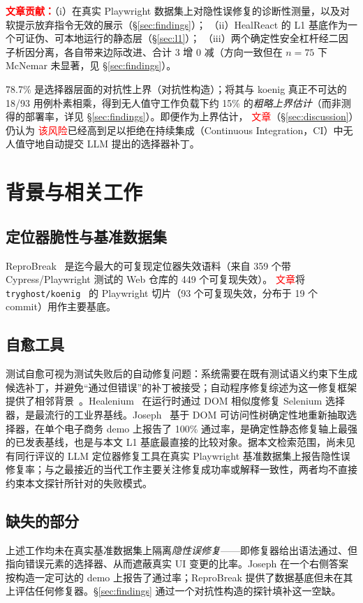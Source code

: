 \documentclass[UTF8, a4paper, 10.5pt, twocolumn, fontset=none]{ctexart}
\providecommand{\DIFaddbegin}{} %
\providecommand{\DIFaddend}{} %
\providecommand{\DIFaddtex}[1]{\textcolor{red}{#1}} %
\providecommand{\DIFadd}[1]{\texorpdfstring{\DIFaddtex{#1}}{#1}} %
\providecommand{\DIFaddincludegraphics}[2][]{{\color{blue}\fbox{\DIFOincludegraphics[#1]{#2}}}} %
\DeclareRobustCommand{\DIFaddbegin}{\DIFOaddbegin \let\includegraphics\DIFaddincludegraphics} %
\DeclareRobustCommand{\DIFaddend}{\DIFOaddend \let\includegraphics\DIFOincludegraphics} %
\begin{document}
 \DIFaddbegin \noindent\DIFadd{\textbf{文章贡献：}}\DIFaddend （i）在真实 Playwright 数据集上对隐性误修复的诊断性测量，以及对软提示放弃指令无效的展示（\S\ref{sec:findings}）；
（ii）HealReact 的 L1 基底作为一个可证伪、可本地运行的静态层（\S\ref{sec:l1}）；
（iii）两个确定性安全杠杆经二因子析因分离，各自带来边际改进、合计 3 增 0 减（方向一致但在 $n=75$ 下 McNemar 未显著，见 \S\ref{sec:findings}）。

78.7\% 是选择器层面的对抗性上界（对抗性构造）；将其与 koenig 真正不可达的 18/93 用例朴素相乘，得到无人值守工作负载下约 15\% 的\emph{粗略上界估计}（而非测得的部署率，详见 \S\ref{sec:findings}）。即便作为上界估计， \DIFaddbegin \DIFadd{文章}\DIFaddend （\S\ref{sec:discussion}）仍认为 \DIFaddbegin \DIFadd{该风险}\DIFaddend 已经高到足以拒绝在持续集成（Continuous Integration，CI）中无人值守地自动提交 LLM 提出的选择器补丁。

\section{背景与相关工作}
\label{sec:background}

\subsection{定位器脆性与基准数据集}
ReproBreak~\cite{mouraReproBreak2026} 是迄今最大的可复现定位器失效语料（来自 359 个带 Cypress/Playwright 测试的 Web 仓库的 449 个可复现失效）。 \DIFaddbegin \DIFadd{文章}\DIFaddend 将 \texttt{tryghost/koenig}~\cite{koenig} 的 Playwright 切片（93 个可复现失效，分布于 19 个 commit）用作主要基底。

\subsection{自愈工具}
测试自愈可视为测试失败后的自动修复问题：系统需要在既有测试语义约束下生成候选补丁，并避免“通过但错误”的补丁被接受；自动程序修复综述为这一修复框架提供了相邻背景~\cite{li2019programRepair}。Healenium~\cite{healenium} 在运行时通过 DOM 相似度修复 Selenium 选择器，是最流行的工业界基线。Joseph~\cite{joseph2026zerocost} 基于 DOM 可访问性树确定性地重新抽取选择器，在单个电子商务 demo 上报告了 100\% 通过率，是确定性静态修复轴上最强的已发表基线，也是与本文 L1 基底最直接的比较对象。据本文检索范围，尚未见有同行评议的 LLM 定位器修复工具在真实 Playwright 基准数据集上报告隐性误修复率；与之最接近的当代工作主要关注修复成功率或解释一致性，两者均不直接约束本文探针所针对的失败模式。

\subsection{缺失的部分}
上述工作均未在真实基准数据集上隔离\emph{隐性误修复}——即修复器给出语法通过、但指向错误元素的选择器、从而遮蔽真实 UI 变更的比率。Joseph 在一个右侧答案按构造一定可达的 demo 上报告了通过率；ReproBreak 提供了数据基底但未在其上评估任何修复器。\S\ref{sec:findings} 通过一个对抗性构造的探针填补这一空缺。
\end{document}
